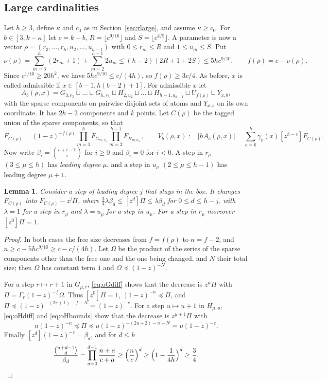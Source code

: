 \documentclass[11pt]{amsart}
\newtheorem{lemma}[theorem]{Lemma}
\theoremstyle{definition}
\theoremstyle{remark}
\numberwithin{equation}{section}
\newcommand{\coef}[1]{[z^{#1}]}
\newcommand{\cle}{\preceq}
\begin{document}
\subsection{Large cardinalities}\label{sec:olarge}
Let $h\ge 3$, define $\kappa$ and $c_0$ as in Section~\ref{sec:rlarge}, and assume $\kappa\ge c_0$. For $b\in[3,k-\kappa]$ let $c=k-b$, $R=\lfloor c^{9/10}\rfloor$ and $S=\lfloor c^{4/5}\rfloor$. A parameter is now a vector $\rho=(r_3,\dots,r_h,u_2,\dots,u_{h-1})$ with $0\le r_m\le R$ and $1\le u_m\le S$. Put
\[
\nu(\rho)=\sum_{m=3}^h(2r_m+1)+\sum_{m=2}^{h-1}2u_m\le(h-2)(2R+1+2S)\le 5hc^{9/10},\qquad f(\rho)=c-\nu(\rho).
\]
Since $c^{1/10}\ge 20h^2$, we have $5hc^{9/10}\le c/(4h)$, so $f(\rho)\ge 3c/4$. As before, $x$ is called admissible if $x\in[b-1,h(b-2)+1]$. For admissible $x$ let
\[
A_b(\rho,x)=G_{3,r_3}\sqcup\dots\sqcup G_{h,r_h}\sqcup H_{2,u_2}\sqcup\dots\sqcup H_{h-1,u_{h-1}}\sqcup U_{f(\rho)}\sqcup Y_{x,b},
\]
with the sparse components on pairwise disjoint sets of atoms and $Y_{x,b}$ on its own coordinate. It has $2h-2$ components and $k$ points. Let $C(\rho)$ be the tagged union of the sparse components, so that
\[
F_{C(\rho)}=(1-z)^{-f(\rho)}\prod_{m=3}^hF_{G_{m,r_m}}\prod_{m=2}^{h-1}F_{H_{m,u_m}},\qquad V_b(\rho,x):=|hA_b(\rho,x)|=\sum_{e=0}^h\gamma_e(x)\coef{h-e}F_{C(\rho)}.
\]
Now write $\beta_i=\binom{c+i-1}{i}$ for $i\ge0$ and $\beta_i=0$ for $i<0$. A step in $r_\mu$ $(3\le\mu\le h)$ has \emph{leading degree} $\mu$, and a step in $u_\mu$ $(2\le\mu\le h-1)$ has leading degree $\mu+1$.

\begin{lemma}\label{lem:osteps}
Consider a step of leading degree $j$ that stays in the box. It changes $F_{C(\rho)}$ into $F_{C(\rho)}-z^j\Pi$, where $\frac34\lambda\beta_d\le\coef d\Pi\le\lambda\beta_d$ for $0\le d\le h-j$, with $\lambda=1$ for a step in $r_\mu$ and $\lambda=u_\mu$ for a step in $u_\mu$. For a step in $r_\mu$ moreover $\coef0\Pi=1$.
\end{lemma}

\begin{proof}
In both cases the free size decreases from $f=f(\rho)$ to $n=f-2$, and $n\ge c-5hc^{9/10}\ge c-c/(4h)$. Let $\Omega$ be the product of the series of the sparse components other than the free one and the one being changed, and $N$ their total size; then $\Omega$ has constant term $1$ and $\Omega\cle(1-z)^{-N}$.

For a step $r\mapsto r+1$ in $G_{\mu,r}$, \eqref{eq:oGdiff} shows that the decrease is $z^\mu\Pi$ with $\Pi=\Gamma_r(1-z)^{-f}\Omega$. Thus $\coef0\Pi=1$, $(1-z)^{-n}\cle\Pi$, and $\Pi\cle(1-z)^{-(2r+1)-f-N}=(1-z)^{-c}$. For a step $u\mapsto u+1$ in $H_{\mu,u}$, \eqref{eq:oHdiff} and \eqref{eq:oHbounds} show that the decrease is $z^{\mu+1}\Pi$ with
\[
u(1-z)^{-n}\cle\Pi\cle u(1-z)^{-(2u+2)-n-N}=u(1-z)^{-c}.
\]
Finally $\coef d(1-z)^{-c}=\beta_d$, and for $d\le h$
\[
\frac{\binom{n+d-1}{d}}{\beta_d}=\prod_{a=0}^{d-1}\frac{n+a}{c+a}\ge\Bigl(\frac nc\Bigr)^d\ge\Bigl(1-\frac1{4h}\Bigr)^d\ge\frac34.\qedhere
\]
\end{proof}
\end{document}
